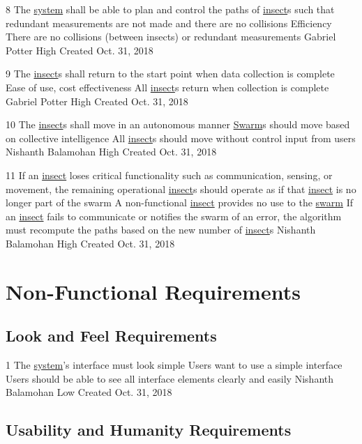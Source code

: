 \documentclass[11pt]{article}
\begin{document}
\functionalRequirement
{8}
{The \hyperref[sec:definitions]{system} shall be able to plan and control the paths of \hyperref[sec:definitions]{insect}s such that redundant measurements are not made and there are no collisions}
{Efficiency}
{There are no collisions (between insects) or redundant measurements}
{Gabriel Potter}
{High}
{Created Oct. 31, 2018}

\functionalRequirement
{9}
{The \hyperref[sec:definitions]{insect}s shall return to the start point when data collection is complete}
{Ease of use, cost effectiveness}
{All \hyperref[sec:definitions]{insect}s return when collection is complete}
{Gabriel Potter}
{High}
{Created Oct. 31, 2018}

\functionalRequirement
{10}
{The \hyperref[sec:definitions]{insect}s shall move in an autonomous manner}
{\hyperref[sec:definitions]{Swarm}s should move based on collective intelligence}
{All \hyperref[sec:definitions]{insect}s should move without control input from users}
{Nishanth Balamohan}
{High}
{Created Oct. 31, 2018}

\functionalRequirement
{11}
{If an \hyperref[sec:definitions]{insect} loses critical functionality such as communication, sensing, or movement, the remaining operational \hyperref[sec:definitions]{insect}s should operate as if that \hyperref[sec:definitions]{insect} is no longer part of the swarm}
{A non-functional \hyperref[sec:definitions]{insect} provides no use to the \hyperref[sec:definitions]{swarm}}
{If an \hyperref[sec:definitions]{insect} fails to communicate or notifies the swarm of an error, the algorithm must recompute the paths based on the new number of \hyperref[sec:definitions]{insect}s}
{Nishanth Balamohan}
{High}
{Created Oct. 31, 2018}

\section{Non-Functional Requirements}

\subsection{Look and Feel Requirements}
\nonFunctionalRequirement
{1}
{The \hyperref[sec:definitions]{system}'s interface must look simple}
{Users want to use a simple interface}
{Users should be able to see all interface elements clearly and easily}
{Nishanth Balamohan}
{Low}
{Created Oct. 31, 2018}

\subsection{Usability and Humanity Requirements}
\end{document}
